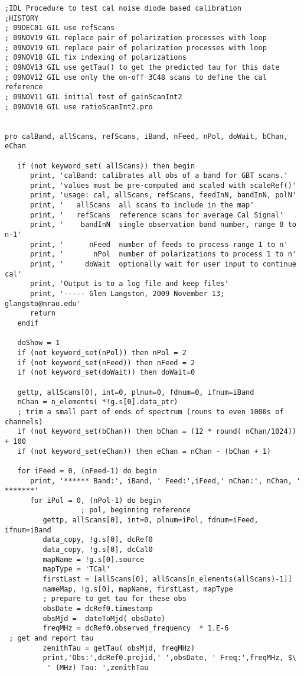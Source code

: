 \documentclass[12pt,twoside]{article}
\begin{document}
\begin{verbatim}
;IDL Procedure to test cal noise diode based calibration
;HISTORY
; 09DEC01 GIL use refScans
; 09NOV19 GIL replace pair of polarization processes with loop
; 09NOV19 GIL replace pair of polarization processes with loop
; 09NOV18 GIL fix indexing of polarizations
; 09NOV13 GIL use getTau() to get the predicted tau for this date
; 09NOV12 GIL use only the on-off 3C48 scans to define the cal reference
; 09NOV11 GIL initial test of gainScanInt2
; 09NOV10 GIL use ratioScanInt2.pro 


pro calBand, allScans, refScans, iBand, nFeed, nPol, doWait, bChan, eChan

   if (not keyword_set( allScans)) then begin
      print, 'calBand: calibrates all obs of a band for GBT scans.'
      print, 'values must be pre-computed and scaled with scaleRef()'
      print, 'usage: cal, allScans, refScans, feedInN, bandInN, polN'
      print, '   allScans  all scans to include in the map'
      print, '   refScans  reference scans for average Cal Signal'
      print, '    bandInN  single observation band number, range 0 to n-1'
      print, '      nFeed  number of feeds to process range 1 to n'
      print, '       nPol  number of polarizations to process 1 to n'
      print, '     doWait  optionally wait for user input to continue cal'
      print, 'Output is to a log file and keep files'
      print, '----- Glen Langston, 2009 November 13; glangsto@nrao.edu'
      return
   endif

   doShow = 1
   if (not keyword_set(nPol)) then nPol = 2
   if (not keyword_set(nFeed)) then nFeed = 2
   if (not keyword_set(doWait)) then doWait=0

   gettp, allScans[0], int=0, plnum=0, fdnum=0, ifnum=iBand
   nChan = n_elements( *!g.s[0].data_ptr)
   ; trim a small part of ends of spectrum (rouns to even 1000s of channels)
   if (not keyword_set(bChan)) then bChan = (12 * round( nChan/1024)) + 100
   if (not keyword_set(eChan)) then eChan = nChan - (bChan + 1)

   for iFeed = 0, (nFeed-1) do begin 
      print, '****** Band:', iBand, ' Feed:',iFeed,' nChan:', nChan, ' *******'
      for iPol = 0, (nPol-1) do begin 
                  ; pol, beginning reference
         gettp, allScans[0], int=0, plnum=iPol, fdnum=iFeed, ifnum=iBand
         data_copy, !g.s[0], dcRef0
         data_copy, !g.s[0], dcCal0
         mapName = !g.s[0].source
         mapType = 'TCal' 
         firstLast = [allScans[0], allScans[n_elements(allScans)-1]]
         nameMap, !g.s[0], mapName, firstLast, mapType
         ; prepare to get tau for these obs
         obsDate = dcRef0.timestamp
         obsMjd =  dateToMjd( obsDate)
         freqMHz = dcRef0.observed_frequency  * 1.E-6
 ; get and report tau
         zenithTau = getTau( obsMjd, freqMHz)
         print,'Obs:',dcRef0.projid,' ',obsDate, ' Freq:',freqMHz, $\
          ' (MHz) Tau: ',zenithTau


\end{verbatim}
\end{document}
